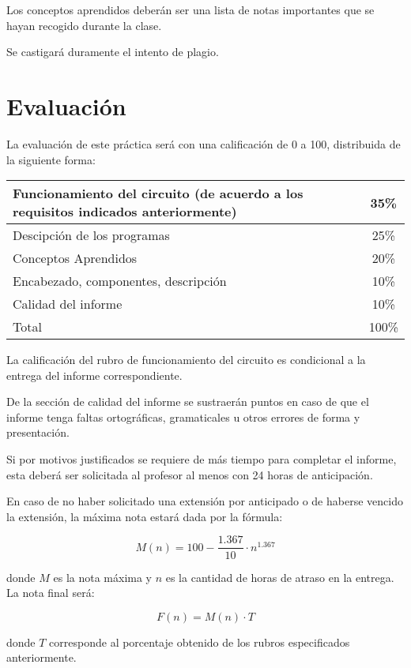 \documentclass[12pt,letterpaper]{IEEEtran}
\begin{document}
Los conceptos aprendidos deberán ser una lista de notas importantes que se hayan recogido durante la clase. 

Se castigará duramente el intento de plagio.

\section{Evaluación}

La evaluación de este práctica será con una calificación de 0 a 100, distribuida de la siguiente forma:

\begin{center}
 \begin{tabular}{p{}|c}\hline
   Funcionamiento del circuito (de acuerdo a los requisitos indicados anteriormente) 					     & 35\% \\\hline
   Descipción de los programas			& 25\% \\\hline
   Conceptos Aprendidos					& 20\% \\\hline
   Encabezado, componentes, descripción & 10\% \\\hline
   Calidad del informe					& 10\% \\\hline\hline
   Total								& 100\% \\
 \end{tabular}
\end{center}

La calificación del rubro de funcionamiento del circuito es condicional a la entrega del informe correspondiente.

De la sección de calidad del informe se sustraerán puntos en caso de que el informe tenga faltas ortográficas, gramaticales u otros errores de forma y presentación.

Si por motivos justificados se requiere de más tiempo para completar el informe, esta deberá ser solicitada al profesor al menos con 24 horas de anticipación.

En caso de no haber solicitado una extensión por anticipado o de haberse vencido la extensión, la máxima nota estará dada por la fórmula:

\[ M(n) = 100-\frac{1.367}{10}\cdot n^{1.367} \]

donde $M$ es la nota máxima y $n$ es la cantidad de horas de atraso en la entrega. La nota final será:

\[ F(n) = M(n)\cdot T \]

donde $T$ corresponde al porcentaje obtenido de los rubros especificados anteriormente.
\end{document}
